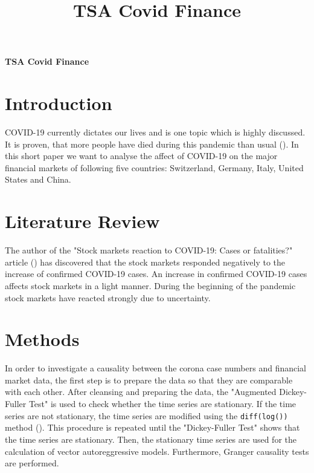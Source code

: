 \documentclass[11pt]{article}
\title{TSA Covid Finance}
\begin{document}
\begin{center}
\textbf{\Large TSA Covid Finance}    
\end{center}


\section{Introduction}
COVID-19 currently dictates our lives and is one topic which is highly discussed. It is proven, that more people have died during this pandemic than usual (\cite{owidcoronavirus}). In this short paper we want to analyse the affect of COVID-19 on the major financial markets of following five countries: Switzerland, Germany, Italy, United States and China.

\section{Literature Review}
The author of the "Stock markets reaction to COVID-19: Cases or fatalities?" article (\cite{stock-covid-reaction}) has discovered that the stock markets responded negatively to the increase of confirmed COVID-19 cases. An increase in confirmed COVID-19 cases affects stock markets in a light manner. During the beginning of the pandemic stock markets have reacted strongly due to uncertainty.



\section{Methods}
In order to investigate a causality between the corona case numbers and financial market data, the first step is to prepare the data so that they are comparable with each other. After cleansing and preparing the data, the "Augmented Dickey-Fuller Test" is used to check whether the time series are stationary. If the time series are not stationary, the time series are modified using the \lstinline{diff(log())} method (). This procedure is repeated until the "Dickey-Fuller Test" shows that the time series are stationary. Then, the stationary time series are used for the calculation of vector autoreggressive models. Furthermore, Granger causality tests are performed.
\end{document}
